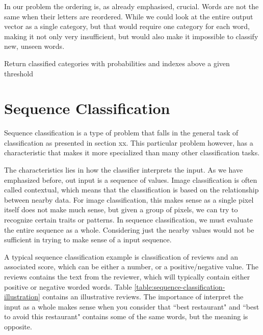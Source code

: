 In our problem the ordering is, as already emphasised, crucial. Words are not the same when their letters are reordered. While we could look at the entire output vector as a single category, but that would require one category for each word, making it not only very insufficient, but would also make it impossible to classify new, unseen words.

\begin{algorithm}
    \caption{Return classified categories with probabilities and indexes above a given threshold
        \label{alg:classification_probability_example}}
    \begin{algorithmic}[1]
        \Statex
             
                     
                \EndIf
            \EndFor
        \State {}
        \EndFunction
    \end{algorithmic}
\end{algorithm}


\section{Sequence Classification}
Sequence classification is a type of problem that falls in the general task of classification as presented in section xx. This particular problem however, has a characteristic that makes it more specialized than many other classification tasks.

The characteristics lies in how the classifier interprets the input. As we have emphasized before, out input is a sequence of values. Image classification is often called contextual, which means that the classification is based on the relationship between nearby data. For image classification, this makes sense as a single pixel itself does not make much sense, but given a group of pixels, we can try to recognize certain traits or patterns. In sequence classification, we must evaluate the entire sequence as a whole. Considering just the nearby values would not be sufficient in trying to make sense of a input sequence. 

A typical sequence classification example is classification of reviews and an associated score, which can be either a number, or a positive/negative value. The reviews contains the text from the reviewer, which will typically contain either positive or negative worded words. Table \ref{table:sequence-classification-illustration} contains an illustrative reviews. The importance of interpret the input as a whole makes sense when you consider that ``best restaurant" and ``best to avoid this restaurant" contains some of the same words, but the meaning is opposite.

